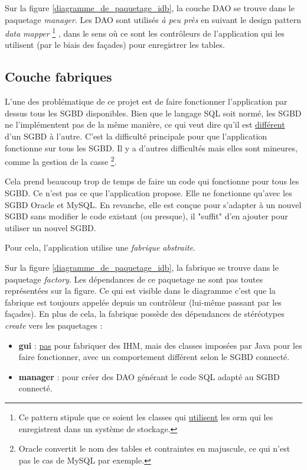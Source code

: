 Sur la figure \ref{diagramme_de_paquetage_idb}, la couche DAO se trouve dans le paquetage \textit{manager}.
Les DAO sont utilisés \textit{à peu près} en suivant le design pattern \textit{data mapper}
\footnote{\label{faux_data_mapper}Ce pattern stipule que ce soient les classes qui \underline{utilisent} les \gls{orm} qui les enregistrent dans un système de stockage.}
, dans le sens où ce sont les contrôleurs de l'application qui les utilisent (par le biais des façades) pour enregistrer les tables.

\subsection{Couche fabriques}
L'une des problématique de ce projet est de faire fonctionner l'application par dessus tous les SGBD disponibles.
Bien que le langage SQL soit normé, les SGBD ne l'implémentent pas de la même manière, ce qui veut dire qu'il est \underline{différent} d'un SGBD à l'autre. C'est la difficulté principale pour que l'application fonctionne sur tous les SGBD. Il y a d'autres difficultés mais elles sont mineures, comme la gestion de la casse
\footnote{\label{casse_et_sgbd}Oracle convertit le nom des tables et contraintes en majuscule, ce qui n'est pas le cas de MySQL par exemple.}.

Cela prend beaucoup trop de temps de faire un code qui fonctionne pour tous les SGBD.
Ce n'est pas ce que l'application propose.
Elle ne fonctionne qu'avec les SGBD Oracle et MySQL.
En revanche, elle est conçue pour s'adapter à un nouvel SGBD sans modifier le code existant (ou presque), il "suffit" d'en ajouter pour utiliser un nouvel SGBD.

Pour cela, l'application utilise une \textit{fabrique abstraite}.

Sur la figure \ref{diagramme_de_paquetage_idb}, la fabrique se trouve dans le paquetage \textit{factory}.
Les dépendances de ce paquetage ne sont pas toutes représentées sur la figure.
Ce qui est visible dans le diagramme c'est que la fabrique est toujours appelée depuis un contrôleur (lui-même passant par les façades).
En plus de cela, la fabrique possède des dépendances de stéréotypes \textit{create} vers les paquetages :
\begin{itemize}
\item \textbf{gui} : \underline{pas} pour fabriquer des IHM, mais des classes imposées par Java pour les faire fonctionner, avec un comportement différent selon le SGBD connecté.
\item \textbf{manager} : pour créer des DAO générant le code SQL adapté au SGBD connecté.
\end{itemize}
